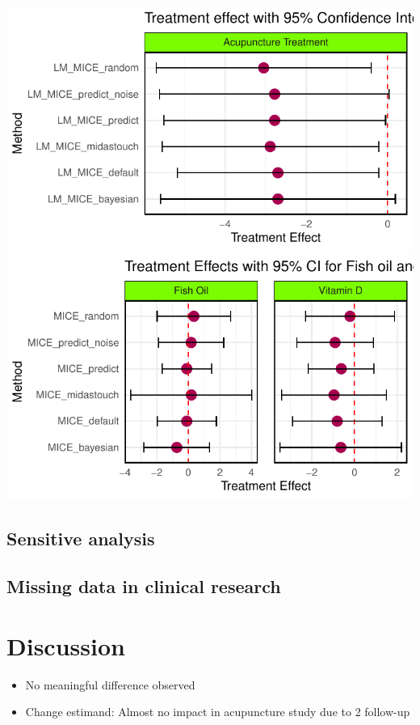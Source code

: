 \documentclass{article}
\providecommand{\tightlist}{%
  \setlength{\itemsep}{0pt}\setlength{\parskip}{0pt}}
\newcommand{\pandocbounded}[1]{#1}
\begin{document}
\pandocbounded{\includegraphics[keepaspectratio]{Final_Report_files/figure-latex/unnamed-chunk-21-1.pdf}}
\pandocbounded{\includegraphics[keepaspectratio]{Final_Report_files/figure-latex/unnamed-chunk-21-2.pdf}}

\subsection{Sensitive analysis}\label{sensitive-analysis-1}

\subsection{Missing data in clinical
research}\label{missing-data-in-clinical-research}

\section{Discussion}\label{discussion}

\begin{itemize}
\tightlist
\item
  No meaningful difference observed
\item
  Change estimand: Almost no impact in acupuncture study due to 2
  follow-up
\end{itemize}
\end{document}
